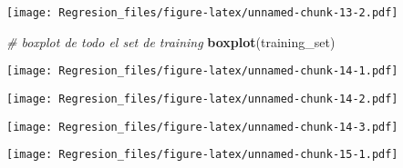 \documentclass[]{article}
\newenvironment{Shaded}{\begin{snugshade}}{\end{snugshade}}
\newcommand{\CommentTok}[1]{\textcolor[rgb]{0.56,0.35,0.01}{\textit{#1}}}
\newcommand{\DataTypeTok}[1]{\textcolor[rgb]{0.13,0.29,0.53}{#1}}
\newcommand{\KeywordTok}[1]{\textcolor[rgb]{0.13,0.29,0.53}{\textbf{#1}}}
\newcommand{\NormalTok}[1]{#1}
\newcommand{\OperatorTok}[1]{\textcolor[rgb]{0.81,0.36,0.00}{\textbf{#1}}}
\newcommand{\StringTok}[1]{\textcolor[rgb]{0.31,0.60,0.02}{#1}}
\begin{document}
\texttt{[image: Regresion\_files/figure-latex/unnamed-chunk-13-2.pdf]}

\begin{Shaded}
\begin{Highlighting}[]
\CommentTok{# boxplot de todo el set de training}
\KeywordTok{boxplot}\NormalTok{(training_set)}
\end{Highlighting}
\end{Shaded}

\texttt{[image: Regresion\_files/figure-latex/unnamed-chunk-14-1.pdf]}

\begin{Shaded}
\end{Shaded}

\texttt{[image: Regresion\_files/figure-latex/unnamed-chunk-14-2.pdf]}

\begin{Shaded}
\end{Shaded}

\texttt{[image: Regresion\_files/figure-latex/unnamed-chunk-14-3.pdf]}

\begin{Shaded}
\end{Shaded}

\texttt{[image: Regresion\_files/figure-latex/unnamed-chunk-15-1.pdf]}

\begin{Shaded}
\end{Shaded}
\end{document}
